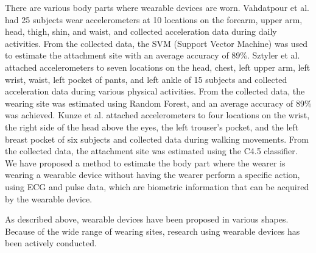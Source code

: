 \documentclass[sigchi,authordraft]{acmart}
\begin{document}
There are various body parts where wearable devices are worn.
Vahdatpour et al.\cite{localization_vahdatpour} had 25 subjects wear accelerometers at 10 locations on the forearm, upper arm, head, thigh, shin, and waist, and collected acceleration data during daily activities. From the collected data, the SVM (Support Vector Machine) was used to estimate the attachment site with an average accuracy of 89\%.
Sztyler et al.\cite{localization_sztyler} attached accelerometers to seven locations on the head, chest, left upper arm, left wrist, waist, left pocket of pants, and left ankle of 15 subjects and collected acceleration data during various physical activities. From the collected data, the wearing site was estimated using Random Forest, and an average accuracy of 89\% was achieved.
Kunze et al.\cite{localization_kunze} attached accelerometers to four locations on the wrist, the right side of the head above the eyes, the left trouser’s pocket, and the left breast pocket of six subjects and collected data during walking movements. From the collected data, the attachment site was estimated using the C4.5 classifier.
We have proposed a method to estimate the body part where the wearer is wearing a wearable device without having the wearer perform a specific action, using ECG and pulse data, which are biometric information that can be acquired by the wearable device.\cite{localization_yoshida}\par

As described above, wearable devices have been proposed in various shapes. Because of the wide range of wearing sites, research using wearable devices has been actively conducted.


\end{document}

